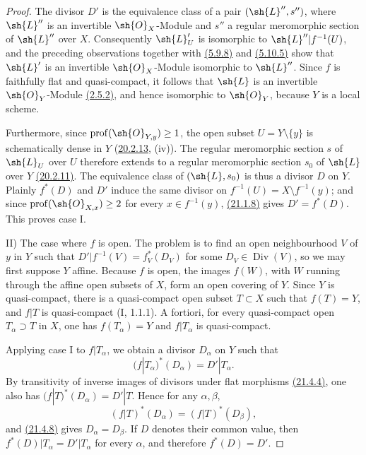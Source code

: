 \begin{proof}
The divisor $D'$ is the equivalence class of a pair
$(\sh{L}'',s'')$, where $\sh{L}''$ is an invertible $\sh{O}_X$-Module
and $s''$ a regular meromorphic section of $\sh{L}''$ over $X$.
Consequently $\sh{L}'_U$ is isomorphic to
$\sh{L}''|f^{-1}(U)$, and the preceding observations together with
{\hyperlink{ega4.c04.prop.5-9-8}{(5.9.8)}} and {\hyperlink{ega4.c04.thm.5-10-5}{(5.10.5)}} show that $\sh{L}'$ is an invertible
$\sh{O}_X$-Module isomorphic to $\sh{L}''$.  Since $f$ is faithfully
flat and quasi-compact, it follows that $\sh{L}$ is an invertible
$\sh{O}_Y$-Module {\hyperlink{ega4.c04.prop.2-5-2}{(2.5.2)}}, and hence isomorphic to $\sh{O}_Y$, because
$Y$ is a local scheme.

Furthermore, since $\operatorname{prof}(\sh{O}_{Y,y})\geq 1$, the open
subset $U=Y\setminus\{y\}$ is schematically dense in $Y$
({\hyperlink{ega4.c04.statement.20-2-13}{20.2.13}}, (iv)).  The regular meromorphic section $s$ of $\sh{L}_U$
over $U$ therefore extends to a regular meromorphic section $s_0$ of
$\sh{L}$ over $Y$ {\hyperlink{ega4.c04.prop.20-2-11}{(20.2.11)}}.  The equivalence class of
$(\sh{L},s_0)$ is thus a divisor $D$ on $Y$.  Plainly $f^*(D)$ and
$D'$ induce the same divisor on
$f^{-1}(U)=X\setminus f^{-1}(y)$; and since
$\operatorname{prof}(\sh{O}_{X,x})\geq 2$ for every
$x\in f^{-1}(y)$, {\hyperlink{ega4.c04.prop.21-1-8}{(21.1.8)}} gives $D'=f^*(D)$.  This proves case I.

\textup{II) The case where $f$ is open.}
The problem is to find an open neighbourhood $V$ of $y$ in $Y$ such
that $D'|f^{-1}(V)=f_V^*(D_V)$ for some
$D_V\in\operatorname{Div}(V)$, so we may first suppose $Y$ affine.
Because $f$ is open, the images $f(W)$, with $W$ running through the
affine open subsets of $X$, form an open covering of $Y$.  Since $Y$
is quasi-compact, there is a quasi-compact open subset $T\subset X$
such that $f(T)=Y$, and $f|T$ is quasi-compact (I, 1.1.1).  A fortiori,
for every quasi-compact open $T_\alpha\supset T$ in $X$,
one has
$f(T_\alpha)=Y$ and $f|T_\alpha$ is quasi-compact.

Applying case I to $f|T_\alpha$, we obtain a divisor $D_\alpha$ on
$Y$ such that
\[
 (f|T_\alpha)^*(D_\alpha)=D'|T_\alpha.
\]
By transitivity of inverse images of divisors under flat morphisms
{\hyperlink{ega4.c04.statement.21-4-4}{(21.4.4)}}, one also has
$(f|T)^*(D_\alpha)=D'|T$.  Hence for any $\alpha,\beta$,
\[
 (f|T)^*(D_\alpha)=(f|T)^*(D_\beta),
\]
and {\hyperlink{ega4.c04.prop.21-4-8}{(21.4.8)}} gives $D_\alpha=D_\beta$.  If $D$ denotes their common
value, then $f^*(D)|T_\alpha=D'|T_\alpha$ for every $\alpha$, and
therefore $f^*(D)=D'$.
\end{proof}

